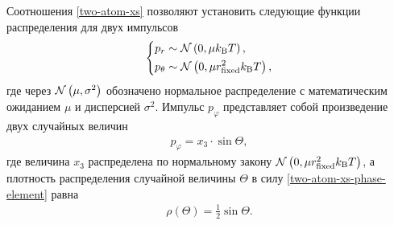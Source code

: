 Соотношения \eqref{two-atom-xs} позволяют установить следующие функции распределения для двух импульсов
\begin{gather}
    \left\{
    \begin{aligned}
        p_r &\sim \mathcal{N} \left( 0, \mu k_\text{B} T \right), \\
        p_\theta &\sim \mathcal{N} \left( 0, \mu r_\text{fixed}^2 k_\text{B} T \right), 
    \end{aligned}
    \right.
\end{gather}
%
где через $\mathcal{N} \left( \mu, \sigma^2 \right)$ обозначено нормальное распределение с математическим ожиданием $\mu$ и дисперсией $\sigma^2$. Импульс $p_\varphi$ представляет собой произведение двух случайных величин
\begin{gather}
    p_\varphi = x_3 \cdot \sin \Theta, \label{two-atom-pvarphi-generation}
\end{gather}
% 
где величина $x_3$ распределена по нормальному закону $\mathcal{N} \left( 0, \mu r_\text{fixed}^2 k_\text{B} T \right)$, а плотность распределения случайной величины $\Theta$ в силу \eqref{two-atom-xs-phase-element} равна
\begin{gather}
    \rho(\Theta) = \frac{1}{2} \sin \Theta.
\end{gather}

